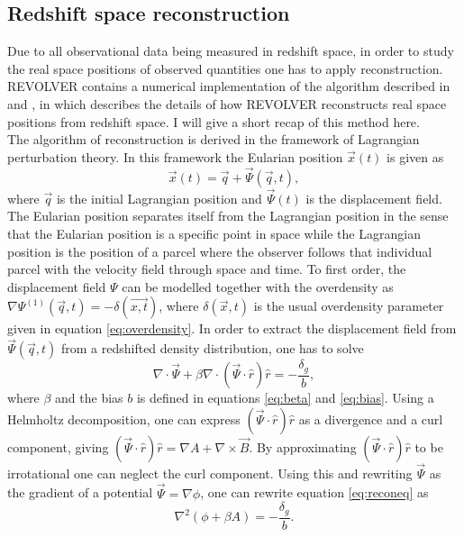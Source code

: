 \subsection{Redshift space reconstruction}\label{sec:reconstruction}
Due to all observational data being measured in redshift space, in order to study
the real space positions of observed quantities one has to apply reconstruction. REVOLVER contains a numerical implementation of
the algorithm described in \cite{Nadathur_2018} and \cite{Burden_reconstruction}, in which describes the details
of how REVOLVER reconstructs real space positions from redshift space. I will give a
short recap of this method here.\\\indent
The algorithm of reconstruction is derived in the framework of Lagrangian
perturbation theory. In this framework the Eularian position $\vec{x}(t)$ is
given as
\begin{equation}
    \vec{x}(t)=\vec{q}+\vec{\Psi}(\vec{q},t),
\end{equation}
where $\vec{q}$ is the initial Lagrangian position and $\vec{\Psi}(t)$ is the
displacement field. The Eularian position separates itself from the Lagrangian
position in the sense that the Eularian position is a specific point in space
while the Lagrangian position is the position of a parcel where the observer
follows that individual parcel with the velocity field through space and time.
To first order, the displacement field $\Psi$ can be modelled together with the
overdensity as $\nabla\Psi^{(1)}(\vec{q},t)=-\delta(\vec{x,t})$, where
$\delta(\vec{x},t)$ is the usual overdensity parameter given in equation \ref{eq:overdensity}.
In order to extract the displacement field from $\vec{\Psi}(\vec{q},t)$ from a
redshifted density distribution, one has to solve \cite{recondisplace}
\begin{equation}\label{eq:reconeq}
    \nabla\cdot\vec{\Psi}+\beta\nabla\cdot(\vec{\Psi}\cdot\hat{r})\hat{r}=-\frac{\delta_g}{b},
\end{equation}
where $\beta$ and the bias $b$ is defined in equations
\ref{eq:beta} and \ref{eq:bias}. Using a Helmholtz decomposition, one can
express $(\vec{\Psi}\cdot\hat{r})\hat{r}$ as a divergence and a curl component, giving $(\vec{\Psi}\cdot\hat{r})\hat{r}=\nabla A + \nabla \times \vec{B}$.
By approximating $(\vec{\Psi}\cdot\hat{r})\hat{r}$ to be irrotational one can neglect
the curl component.
Using this and rewriting $\vec{\Psi}$ as the gradient of a
potential $\vec{\Psi}=\nabla\phi$, one can rewrite equation \ref{eq:reconeq} as
\begin{equation}
    \nabla^2(\phi+\beta A)=-\frac{\delta_g}{b}.
\end{equation}
